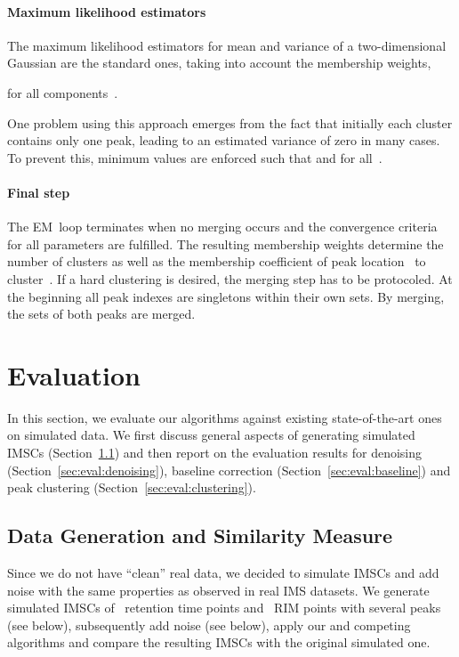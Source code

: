 \documentclass{article}
\begin{document}
\paragraph*{Maximum likelihood estimators}
The maximum likelihood estimators for mean and variance of a two-dimensional Gaussian are the standard ones, taking into account the membership weights,

for all components~.

One problem using this approach emerges from the fact that initially each cluster contains only one peak, leading to an estimated variance of zero in many cases.
To prevent this, minimum values are enforced such that   and  for all~.

\paragraph*{Final step}
The EM~loop terminates when no merging occurs and the convergence criteria for all parameters are fulfilled.
The resulting membership weights determine the number of clusters as well as the membership coefficient of peak location~ to cluster~.
If a hard clustering is desired, the merging step has to be protocoled.
At the beginning all peak indexes are singletons within their own sets.
By merging, the sets of both peaks are merged.



\section{Evaluation}
\label{sec:eval}

In this section, we evaluate our algorithms against existing state-of-the-art ones on simulated data.
We first discuss general aspects of generating simulated IMSCs (Section~\ref{sec:eval:general}) and then report on the evaluation results for denoising (Section~\ref{sec:eval:denoising}), baseline correction (Section~\ref{sec:eval:baseline}) and peak clustering (Section~\ref{sec:eval:clustering}).

\subsection{Data Generation and Similarity Measure}
\label{sec:eval:general}

Since we do not have ``clean'' real data, we decided to simulate IMSCs and add noise with the same properties as observed in real IMS datasets.
We generate simulated IMSCs of~ retention time points and~ RIM points with several peaks (see below), subsequently add noise (see below), apply our and competing algorithms and compare the resulting IMSCs with the original simulated one.
\end{document}
